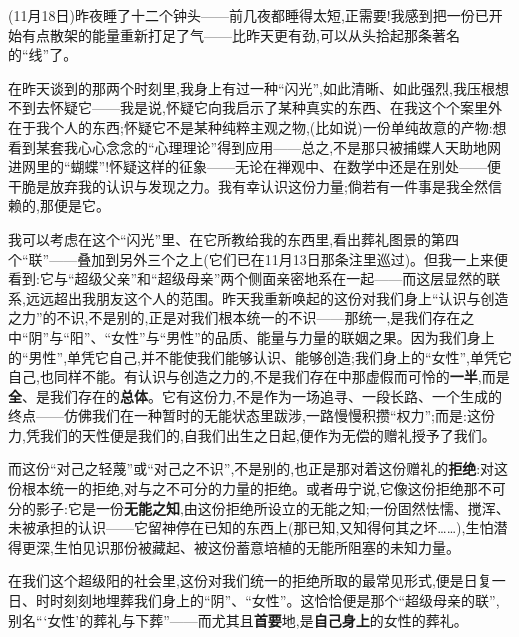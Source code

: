 \label{ch18:local:n33}

(11月18日)昨夜睡了十二个钟头——前几夜都睡得太短,正需要!我感到把一份已开始有点散架的能量重新打足了气——比昨天更有劲,可以从头拾起那条著名的“线”了。

\dmark{}在昨天谈到的那两个时刻里,我身上有过一种“闪光”,如此清晰、如此强烈,我压根想不到去怀疑它——我是说,怀疑它向我启示了某种真实的东西、在我这个个案里外在于我个人的东西;怀疑它不是某种纯粹主观之物,(比如说)一份单纯故意的产物:想看到某套我心心念念的“心理理论”得到应用——总之,不是那只被捕蝶人天助地网进网里的“蝴蝶”!怀疑这样的征象——无论在禅观中、在数学中还是在别处——便干脆是放弃我的认识与发现之力。我有幸认识这份力量;倘若有一件事是我全然信赖的,那便是它。

我可以考虑在这个“闪光”里、在它所教给我的东西里,看出葬礼图景的第四个“联”——叠加到另外三个之上(它们已在11月13日那条注里巡过)。但我一上来便看到:它与“超级父亲”和“超级母亲”两个侧面亲密地系在一起——而这层显然的联系,远远超出我朋友这个人的范围。昨天我重新唤起的这份对我们身上“认识与创造之力”的不识,不是别的,正是对我们根本统一的不识——那统一,是我们存在之中“阴”与“阳”、“女性”与“男性”的品质、能量与力量的联姻之果。因为我们身上的“男性”,单凭它自己,并不能使我们能够认识、能够创造;我们身上的“女性”,单凭它自己,也同样不能。有认识与创造之力的,不是我们存在中那虚假而可怜的\textbf{一半},而是\textbf{全}、是我们存在的\textbf{总体}。它有这份力,不是作为一场追寻、一段长路、一个生成的终点——仿佛我们在一种暂时的无能状态里跋涉,一路慢慢积攒“权力”;而是:这份力,凭我们的天性便是我们的,自我们出生之日起,便作为无偿的赠礼授予了我们。

而这份“对己之轻蔑”或“对己之不识”,不是别的,也正是那对着这份赠礼的\textbf{拒绝}:对这份根本统一的拒绝,对与之不可分的力量的拒绝。或者毋宁说,它像这份拒绝那不可分的影子:它是一份\textbf{无能之知}\dmark{},由这份拒绝所设立的无能之知;一份固然怯懦、搅浑、未被承担的认识——它留神停在已知的东西上(那已知,又知得何其之坏……),生怕潜得更深,生怕见识那份被藏起、被这份蓄意培植的无能所阻塞的未知力量。

在我们这个超级阳的社会里,这份对我们统一的拒绝所取的最常见形式,便是日复一日、时时刻刻地埋葬我们身上的“阴”、“女性”。这恰恰便是那个“超级母亲的联”,别名“‘女性’的葬礼与下葬”——而尤其且\textbf{首要}地,是\textbf{自己身上}的女性的葬礼。

